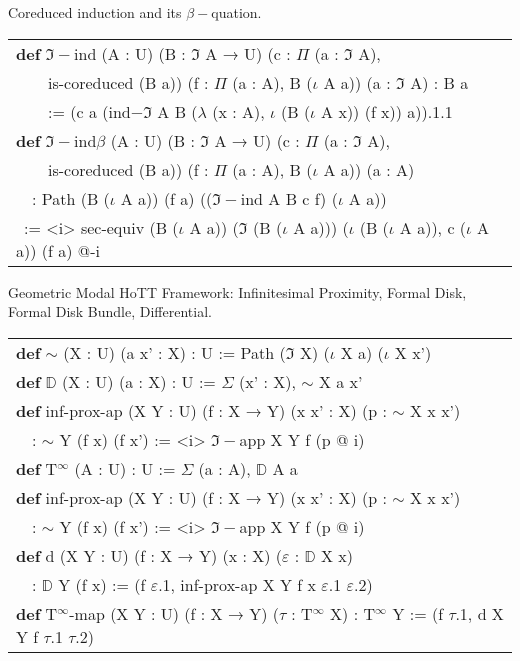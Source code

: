 \documentclass{article}
\theoremstyle{definition}
\newcommand{\tabstyle}[0]{\scriptsize\ttfamily\fontseries{l}\selectfont}
\begin{document}
Coreduced induction and its $\beta-$quation.

\begin{table}[ht]
\tabstyle
\begin{tabular}{l}
\textbf{def} $\Im-$ind (A : U) (B : $\Im$ A → U) (c : $\Pi$ (a : $\Im$ A), \\
\ \ \ \ is-coreduced (B a)) (f : $\Pi$ (a : A), B ($\iota$ A a)) (a : $\Im$ A) : B a \\
\ \ \ \ := (c a (ind$-\Im$ A B ($\lambda$ (x : A), $\iota$ (B ($\iota$ A x)) (f x)) a)).1.1 \\
\textbf{def} $\Im-$ind$\beta$ (A : U) (B : $\Im$ A → U) (c : $\Pi$ (a : $\Im$ A), \\
\ \ \ \ is-coreduced (B a)) (f : $\Pi$ (a : A), B ($\iota$ A a)) (a : A) \\
\ \ : Path (B ($\iota$ A a)) (f a) (($\Im-$ind A B c f) ($\iota$ A a)) \\
\ := <i> sec-equiv (B ($\iota$ A a)) ($\Im$ (B ($\iota$ A a))) ($\iota$ (B ($\iota$ A a)), c ($\iota$ A a)) (f a) @-i \\
\end{tabular}
\end{table}

Geometric Modal HoTT Framework: Infinitesimal Proximity, Formal Disk, Formal Disk Bundle, Differential.

\begin{table}[ht]
\tabstyle
\begin{tabular}{l}
\textbf{def} $\sim$ (X : U) (a x' : X) : U := Path ($\Im$ X) ($\iota$ X a) ($\iota$ X x') \\
\textbf{def} $\mathbb{D}$ (X : U) (a : X) : U := $\Sigma$ (x' : X), $\sim$ X a x' \\
\textbf{def} inf-prox-ap (X Y : U) (f : X → Y) (x x' : X) (p : $\sim$ X x x') \\
\ \ : $\sim$ Y (f x) (f x') := <i> $\Im-$app X Y f (p @ i) \\
\textbf{def} T$^\infty$ (A : U) : U := $\Sigma$ (a : A), $\mathbb{D}$ A a \\
\textbf{def} inf-prox-ap (X Y : U) (f : X → Y) (x x' : X) (p : $\sim$ X x x') \\
\ \ : $\sim$ Y (f x) (f x') := <i> $\Im-$app X Y f (p @ i) \\
\textbf{def} d (X Y : U) (f : X → Y) (x : X) ($\varepsilon$ : $\mathbb{D}$ X x) \\
\ \ : $\mathbb{D}$ Y (f x) := (f $\varepsilon$.1, inf-prox-ap X Y f x $\varepsilon$.1 $\varepsilon$.2) \\
\textbf{def} T$^\infty$-map (X Y : U) (f : X → Y) ($\tau$ : T$^\infty$ X) : T$^\infty$ Y := (f $\tau$.1, d X Y f $\tau$.1 $\tau$.2) \\
\end{tabular}
\end{table}
\end{document}
